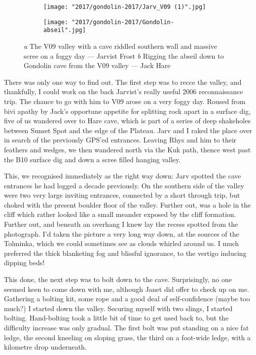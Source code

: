 \begin{figure*}[t!]
\checkoddpage \ifoddpage \forcerectofloat \else \forceversofloat \fi
\centering
    \begin{subfigure}[t]{0.52\textwidth}
        \centering
         \texttt{[image: "2017/gondolin-2017/Jarv\_V09 (1)".jpg]}
        
        \caption{} \label{V09 valley}
    \end{subfigure}
    \hfill
    \begin{subfigure}[t]{0.46\textwidth}
    \centering
        \texttt{[image: "2017/gondolin-2017/Gondolin-abseil".jpg]}
        \caption{} \label{gondolin abseil}
    \end{subfigure}
    \caption{
    \emph{a} The V09 valley with a cave riddled southern wall and massive scree on a foggy day --- Jarvist Frost
     \emph{b} Rigging the abseil down to Gondolin cave from the V09 valley --- Jack Hare }
\end{figure*}


There was only one way to find out. The first step was to recce the valley, and thankfully, I could work on the back Jarvist’s really useful 2006 reconnaissance trip. The chance to go with him to V09 arose on a very foggy day. Roused from bivi apathy by Jack’s opportune appetite for splitting rock apart in a surface dig, five of us wandered over to Hare cave, which is part of a series of deep shakeholes between Sunset Spot and the edge of the Plateau. Jarv and I raked the place over in search of the previously GPS'ed entrances. Leaving Rhys and him to their feathers and wedges, we then wandered north via the Kuk path, thence west past the B10 surface dig and down a scree filled hanging valley.

This, we recognised immediately as the right way down: Jarv spotted the cave entrances he had logged a decade previously. On the southern side of the valley were two very large inviting entrances, connected by a short through trip, but choked with the present boulder floor of the valley. Further out, was a hole in the cliff which rather looked like a small meander exposed by the cliff formation. Further out, and beneath an overhang I knew lay the recess spotted from the photograph. I’d taken the picture a very long way down, at the sources of the Tolminka, which we could sometimes see as clouds whirled around us. I much preferred the thick blanketing fog and blissful ignorance, to the vertigo inducing dipping beds!

This done, the next step was to bolt down to the cave. Surprisingly, no one seemed keen to come down with me, although Janet did offer to check up on me. Gathering a bolting kit, some rope and a good deal of self-confidence (maybe too much?) I started down the valley. Securing myself with two slings, I started bolting. Hand-bolting took a little bit of time to get used back to, but the difficulty increase was only gradual. The first bolt was put standing on a nice fat ledge, the second kneeling on sloping grass, the third on a foot-wide ledge, with a kilometre drop underneath.

